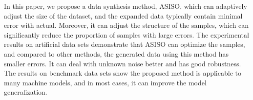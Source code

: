 \documentclass[sn-mathphys,Numbered]{sn-jnl}%
\theoremstyle{thmstyleone}%
\theoremstyle{thmstyletwo}%
\theoremstyle{thmstylethree}%
\begin{document}
In this paper, we propose a data synthesis method, ASISO, which can adaptively adjust the size of the dataset, and the expanded data typically contain minimal error with actual. Moreover, it can adjust the structure of the samples, which can significantly reduce the proportion of samples with large errors. The experimental results on artificial data sets demonstrate that ASISO can optimize the samples, and compared to other methods, the generated data using this method has smaller errors. It can deal with unknown noise better and has good robustness. The results on benchmark data sets show the proposed method is applicable to many machine models, and in most cases, it can improve the model generalization.



\end{document}
